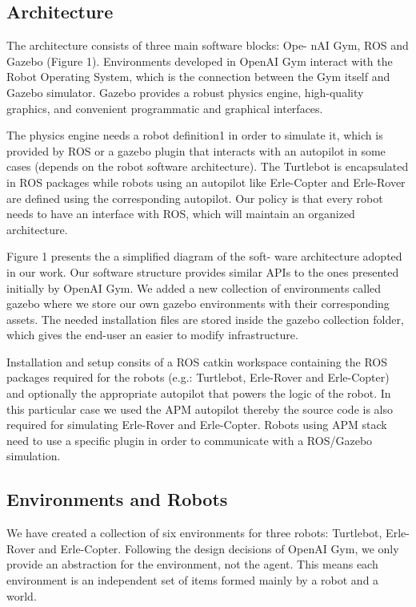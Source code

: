 \subsection{Architecture}

The architecture consists of three main software blocks: Ope- nAI Gym, ROS and Gazebo (Figure 1). Environments developed in OpenAI Gym interact with the Robot Operating System, which is the connection between the Gym itself and Gazebo simulator. Gazebo provides a robust physics engine, high-quality graphics, and convenient programmatic and graphical interfaces.

The physics engine needs a robot definition1 in order to simulate it, which is provided by ROS or a gazebo plugin that interacts with an autopilot in some cases (depends on the robot software architecture). The Turtlebot is encapsulated in ROS packages while robots using an autopilot like Erle-Copter and Erle-Rover are defined using the corresponding autopilot. Our policy is that every robot needs to have an interface with ROS, which will maintain an organized architecture.

Figure 1 presents the a simplified diagram of the soft- ware architecture adopted in our work. Our software structure provides similar APIs to the ones presented initially by OpenAI Gym. We added a new collection of environments called gazebo where we store our own gazebo environments with their corresponding assets. The needed installation files are stored inside the gazebo collection folder, which gives the end-user an easier to modify infrastructure.

Installation and setup consits of a ROS catkin workspace containing the ROS packages required for the robots (e.g.: Turtlebot, Erle-Rover and Erle-Copter) and optionally the appropriate autopilot that powers the logic of the robot. In this particular case we used the APM autopilot thereby the source code is also required for simulating Erle-Rover and Erle-Copter. Robots using APM stack need to use a specific plugin in order to communicate with a ROS/Gazebo simulation.

\subsection{Environments and Robots}

We have created a collection of six environments for three robots: Turtlebot, Erle-Rover and Erle-Copter. Following the design decisions of OpenAI Gym, we only provide an abstraction for the environment, not the agent. This means each environment is an independent set of items formed mainly by a robot and a world.

